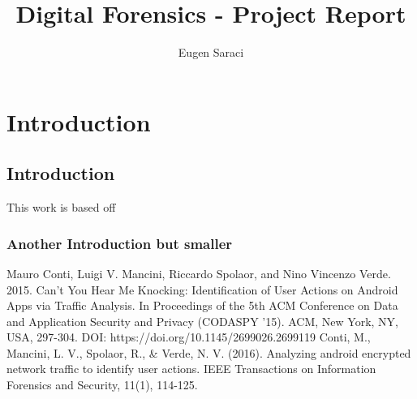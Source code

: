 \documentclass[a4paper,10pt]{report}
\title{Digital Forensics - Project Report}
\author{Eugen Saraci}
\begin{document}
\maketitle

\chapter{Introduction}
\label{ch:intro}

\section{Introduction}
This work is based off

\subsection{Another Introduction but smaller}


\begin{thebibliography}{99}
Mauro Conti, Luigi V. Mancini, Riccardo Spolaor, and Nino Vincenzo Verde. 2015. Can't You Hear Me Knocking: Identification of User Actions on Android Apps via Traffic Analysis. In Proceedings of the 5th ACM Conference on Data and Application Security and Privacy (CODASPY '15). ACM, New York, NY, USA, 297-304. DOI: https://doi.org/10.1145/2699026.2699119
 Conti, M., Mancini, L. V., Spolaor, R., \& Verde, N. V. (2016). Analyzing android encrypted network traffic to identify user actions. IEEE Transactions on Information Forensics and Security, 11(1), 114-125.

\end{thebibliography}
\end{document}
